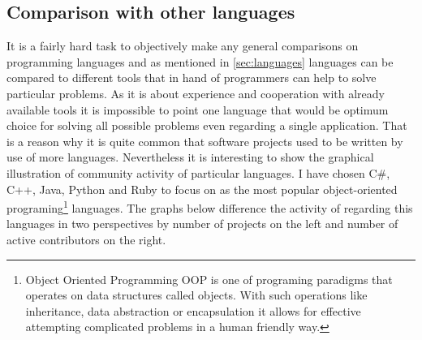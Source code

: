 \subsection{Comparison with other languages}\label{subsec:lang_compare}
It is a fairly hard task to objectively make any general comparisons on programming languages and as mentioned in \ref{sec:languages} languages can be compared to different tools that in hand of programmers can help to solve particular problems. As it is about experience and cooperation with already available tools it is impossible to point one language that would be optimum choice for solving all possible problems even regarding a single application. That is a reason why it is quite common that software projects used to be written by use of more languages. Nevertheless it is interesting to show the graphical illustration of community activity of particular languages. I have chosen C\#, C++, Java, Python and Ruby to focus on as the most popular object-oriented programing\footnote{Object Oriented Programming OOP is one of programing paradigms that operates on data structures called objects. With such operations like inheritance, data abstraction or encapsulation it allows for effective attempting complicated problems in a human friendly way.} languages. The graphs below difference the activity of regarding  this languages in two perspectives by number of projects on the left and number of active contributors on the right.
